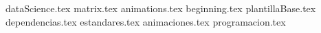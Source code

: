 \documentclass[11pt,oneside]{book}%
\begin{document}
	{dataScience.tex}
	{matrix.tex}
	{animations.tex}
	\frontmatter
		\tableofcontents
		{beginning.tex} 
	\mainmatter
	{plantillaBase.tex}
	{dependencias.tex}
	{estandares.tex}
	{animaciones.tex}
	{programacion.tex}
\end{document}
